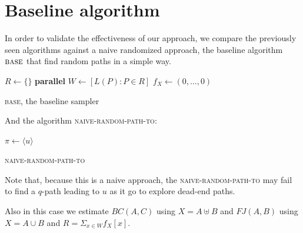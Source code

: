 \section{Baseline algorithm}

In order to validate the effectiveness of our approach, we compare the previously seen algorithms against a naive randomized approach,
the baseline algorithm $\textsc{base}$ that find random paths in a simple way.

\begin{algorithm}[h]
	
	\small
	\DontPrintSemicolon
	\BlankLine
	$R\gets\{\}$\;
	\BlankLine
	\textbf{parallel} 
	\BlankLine
	$W \gets [ L(P) : P \in R ]$\;
	$f_X \gets (0,\ldots,0)$\;
	\BlankLine
	\BlankLine
	\BlankLine
	\caption{\textsc{base}\xspace, the baseline sampler}
	\label{alg:baseline}
\end{algorithm}
	
	And the algorithm \textsc{naive-random-path-to}:
	
	\begin{algorithm}[h]
	\small
	\DontPrintSemicolon
	$\pi\gets \langle u \rangle$\;
	\Return{$\pi$}   
	
	\caption{\textsc{naive-random-path-to}}
	\label{alg:baseline}
\end{algorithm}

Note that, because this is a naive approach, the \textsc{naive-random-path-to}
may fail to find a $q$-path leading to $u$ as it go to explore dead-end paths.

Also in this case we estimate $BC(A,C)$ using $X = A \uplus B$ and $FJ(A,B)$ using $X = A \cup B$ and $R = \Sigma_{x \in W} f_{X}[x]$.

\clearpage
